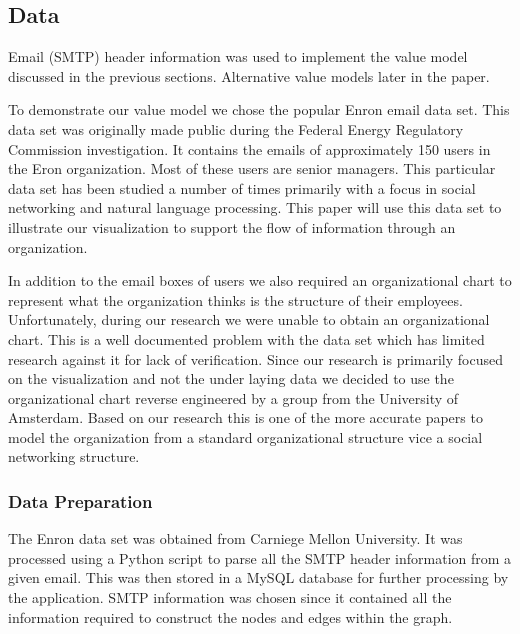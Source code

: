 \documentclass[journal]{vgtc}                %
\begin{document}
\subsection{Data}
Email (SMTP) header information was used to implement the value model discussed in the previous sections.  Alternative value models later in the paper.

To demonstrate our value model we chose the popular Enron email data set.  This data set was originally made public during the Federal Energy Regulatory Commission investigation.  It contains the emails of approximately 150 users in the Eron organization.  Most of these users are senior managers.  This particular data set has been studied a number of times primarily with a focus in social networking and natural language processing.  This paper will use this data set to illustrate our visualization to support the flow of information through an organization.  

In addition to the email boxes of users we also required an organizational chart to represent what the organization thinks is the structure of their employees.  Unfortunately, during our research we were unable to obtain an organizational chart.  This is a well documented problem with the data set which has limited research against it for lack of verification.  Since our research is primarily focused on the visualization and not the under laying data we decided to use the organizational chart reverse engineered by a group from the University of Amsterdam\cite{enronorgchart}.  Based on our research this is one of the more accurate papers to model the organization from a standard organizational structure vice a social networking structure.

\subsubsection{Data Preparation}

The Enron data set was obtained from Carniege Mellon University.  It was processed using a Python script to parse all the SMTP header information from a given email.  This was then stored in a MySQL database for further processing by the application.  SMTP information was chosen since it contained all the information required to construct the nodes and edges within the graph.  
\end{document}
